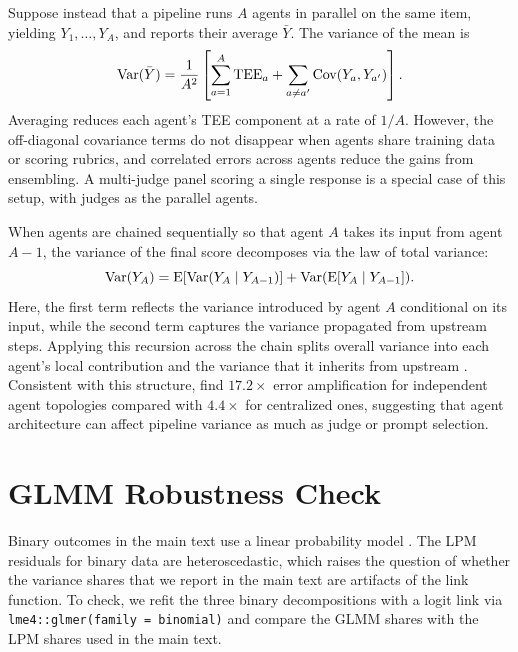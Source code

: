 Suppose instead that a pipeline runs $A$ agents in parallel on the same item, yielding $Y_1,\ldots,Y_A$, and reports their average $\bar Y$. The variance of the mean is
\begin{equation}
\operatorname{Var}(\bar{Y}) = \frac{1}{A^2}\left[\sum_{a=1}^{A} \text{TEE}_a + \sum_{a \neq a'} \operatorname{Cov}(Y_a, Y_{a'})\right].
\end{equation}
Averaging reduces each agent's TEE component at a rate of $1/A$. However, the off-diagonal covariance terms do not disappear when agents share training data or scoring rubrics, and correlated errors across agents reduce the gains from ensembling. A multi-judge panel scoring a single response is a special case of this setup, with judges as the parallel agents.

When agents are chained sequentially so that agent $A$ takes its input from agent $A-1$, the variance of the final score decomposes via the law of total variance:
\begin{equation}
\operatorname{Var}(Y_A) = \operatorname{E}[\operatorname{Var}(Y_A \mid Y_{A-1})] + \operatorname{Var}(\operatorname{E}[Y_A \mid Y_{A-1}]).
\end{equation}
Here, the first term reflects the variance introduced by agent $A$ conditional on its input, while the second term captures the variance propagated from upstream steps. Applying this recursion across the chain splits overall variance into each agent's local contribution and the variance that it inherits from upstream \citep{duan2025uprop}. Consistent with this structure, \citet{kim2025scaling} find $17.2\times$ error amplification for independent agent topologies compared with $4.4\times$ for centralized ones, suggesting that agent architecture can affect pipeline variance as much as judge or prompt selection.



\clearpage

\section{GLMM Robustness Check}
\label{si:glmm}

Binary outcomes in the main text use a linear probability model \citep[LPM,][]{angristpischke2009}. The LPM residuals for binary data are heteroscedastic, which raises the question of whether the variance shares that we report in the main text are artifacts of the link function. To check, we refit the three binary decompositions with a logit link via \texttt{lme4::glmer(family = binomial)} \citep{bates2015lme4} and compare the GLMM shares with the LPM shares used in the main text.

